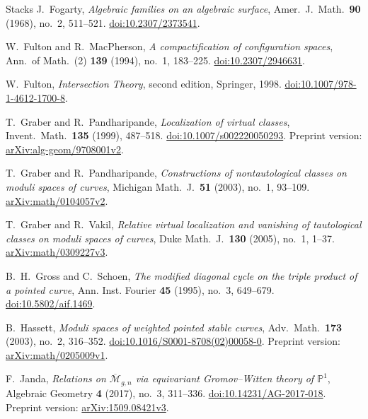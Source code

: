 \begin{thebibliography}{Stacks}
J.~Fogarty,
\emph{Algebraic families on an algebraic surface},
Amer.\ J.\ Math.\ \textbf{90} (1968), no.~2, 511--521.
\href{https://doi.org/10.2307/2373541}{doi:10.2307/2373541}.

W.~Fulton and R.~MacPherson,
\emph{A compactification of configuration spaces},
Ann.\ of Math.\ (2) \textbf{139} (1994), no.~1, 183--225.
\href{https://doi.org/10.2307/2946631}{doi:10.2307/2946631}.

W.~Fulton,
\emph{Intersection Theory},
second edition, Springer, 1998.
\href{https://doi.org/10.1007/978-1-4612-1700-8}{doi:10.1007/978-1-4612-1700-8}.

T.~Graber and R.~Pandharipande,
\emph{Localization of virtual classes},
Invent.\ Math.\ \textbf{135} (1999), 487--518.
\href{https://doi.org/10.1007/s002220050293}{doi:10.1007/s002220050293}.
Preprint version:
\href{https://arxiv.org/abs/alg-geom/9708001v2}{arXiv:alg-geom/9708001v2}.

T.~Graber and R.~Pandharipande,
\emph{Constructions of nontautological classes on moduli spaces of curves},
Michigan Math.\ J.\ \textbf{51} (2003), no.~1, 93--109.
\href{https://arxiv.org/abs/math/0104057v2}{arXiv:math/0104057v2}.

T.~Graber and R.~Vakil,
\emph{Relative virtual localization and vanishing of tautological classes on moduli spaces of curves},
Duke Math.\ J.\ \textbf{130} (2005), no.~1, 1--37.
\href{https://arxiv.org/abs/math/0309227v3}{arXiv:math/0309227v3}.

B.~H.~Gross and C.~Schoen,
\emph{The modified diagonal cycle on the triple product of a pointed curve},
Ann. Inst. Fourier \textbf{45} (1995), no.~3, 649--679.
\href{https://doi.org/10.5802/aif.1469}{doi:10.5802/aif.1469}.

B.~Hassett,
\emph{Moduli spaces of weighted pointed stable curves},
Adv.\ Math.\ \textbf{173} (2003), no.~2, 316--352.
\href{https://doi.org/10.1016/S0001-8708(02)00058-0}{doi:10.1016/S0001-8708(02)00058-0}.
Preprint version:
\href{https://arxiv.org/abs/math/0205009v1}{arXiv:math/0205009v1}.

F.~Janda,
\emph{Relations on $\overline{\mathcal M}_{g,n}$ via equivariant
Gromov--Witten theory of $\mathbb P^1$},
Algebraic Geometry \textbf{4} (2017), no.~3, 311--336.
\href{https://doi.org/10.14231/AG-2017-018}{doi:10.14231/AG-2017-018}.
Preprint version:
\href{https://arxiv.org/abs/1509.08421v3}{arXiv:1509.08421v3}.


\end{thebibliography}

